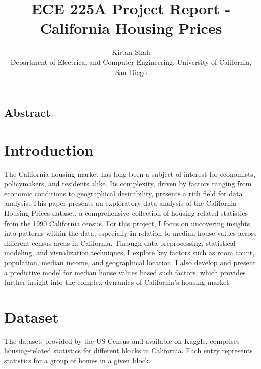 \documentclass[letterpaper,twocolumn,10pt]{article}
\begin{document}
\date{}

\title{\Large \bf ECE 225A Project Report - California Housing Prices}

\author{
{\rm Kirtan Shah}\\
Department of Electrical and Computer Engineering, University of California, San Diego
}

\maketitle

\thispagestyle{empty}


\subsection*{Abstract}

\section{Introduction}
The California housing market has long been a subject of interest for economists, policymakers, and residents alike. 
Its complexity, driven by factors ranging from economic conditions to geographical desirability, presents a rich field for data analysis. 
This paper presents an exploratory data analysis of the California Housing Prices dataset, a comprehensive collection of housing-related statistics from the 1990 California census. 
For this project, I focus on uncovering insights into patterns within the data, especially in relation to median house values across different census areas in California. 
Through data preprocessing, statistical modeling, and visualization techniques, I explore key factors such as room count, population, median income, and geographical location. 
I also develop and present a predictive model for median house values based such factors, which provides further insight into the complex dynamics of California's housing market.



\section{Dataset}
The dataset, provided by the US Census and available on Kaggle, comprises housing-related statistics for different blocks in California.
Each entry represents statistics for a group of homes in a given block.
\end{document}
